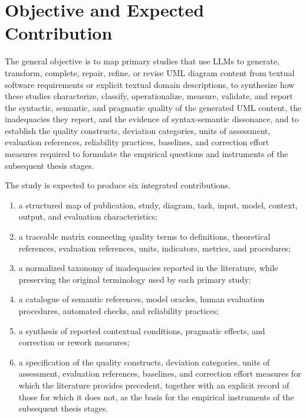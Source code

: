 \section{Objective and Expected Contribution}
\label{sec:protocol_objective}

The general objective is to map primary studies that use LLMs to generate, transform, complete, repair, refine, or revise UML diagram content from textual software requirements or explicit textual domain descriptions, to synthesize how these studies characterize, classify, operationalize, measure, validate, and report the syntactic, semantic, and pragmatic quality of the generated UML content, the inadequacies they report, and the evidence of syntax-semantic dissonance, and to establish the quality constructs, deviation categories, units of assessment, evaluation references, reliability practices, baselines, and correction effort measures required to formulate the empirical questions and instruments of the subsequent thesis stages.

The study is expected to produce six integrated contributions.

\begin{enumerate}[label=\roman*)]
    \item a structured map of publication, study, diagram, task, input, model, context, output, and evaluation characteristics;
    \item a traceable matrix connecting quality terms to definitions, theoretical references, evaluation references, units, indicators, metrics, and procedures;
    \item a normalized taxonomy of inadequacies reported in the literature, while preserving the original terminology used by each primary study;
    \item a catalogue of semantic references, model oracles, human evaluation procedures, automated checks, and reliability practices;
    \item a synthesis of reported contextual conditions, pragmatic effects, and correction or rework measures;
    \item a specification of the quality constructs, deviation categories, units of assessment, evaluation references, baselines, and correction effort measures for which the literature provides precedent, together with an explicit record of those for which it does not, as the basis for the empirical instruments of the subsequent thesis stages.
\end{enumerate}


